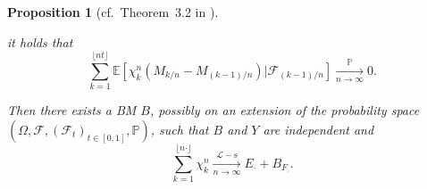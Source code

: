 \documentclass[12pt]{article}
\numberwithin{equation}{section}
\newtheorem{proposition}{Proposition}
\theoremstyle{definition}
\theoremstyle{remark}
\newcommand{\convp}[1][]{\xrightarrow[#1]{\PP}}
\newcommand{\convsl}[1][]{\xrightarrow[#1]{\mathcal{L}-\mathrm{s}}}
\newcommand{\PP}{\mathbb{P}}
\newcommand{\EE}{\mathbb{E}}
\newcommand{\cF}{\mathcal{F}}
\begin{document}
\begin{proposition}[cf.~Theorem~3.2 in \cite{j2}]
\begin{enumerate}[i)]
it holds that
\begin{equation}
	\sum_{k=1}^{\lfloor n t \rfloor} \EE\!\left[ \chi_k^n  (M_{k/n}-M_{{(k-1)}/n}) | \cF_{(k-1)/n}\right] \convp[n\to\infty] 0.
\end{equation}
\end{enumerate}
Then there exists a BM $B$, possibly on an extension of the probability space $(\Omega,\cF,(\mathcal{F}_t)_{t\in [0,1]},\PP)$, such that $B$ and $Y$ are independent 
and
\begin{equation} \sum_{k=1}^{\lfloor n \cdot \rfloor} \chi^n_k
\convsl[n\to\infty] E_\cdot + B_{F_\cdot}.\end{equation}
\end{proposition}
\end{document}
